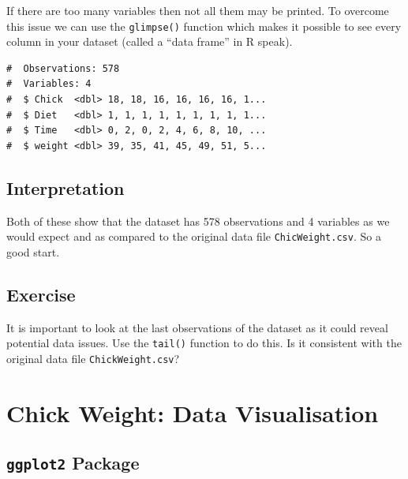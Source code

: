 \documentclass[a4paper,9pt,twocolumn,twoside,printwatermark=false]{pinp}
\begin{document}
If there are too many variables then not all them may be printed. To
overcome this issue we can use the \texttt{glimpse()} function which
makes it possible to see every column in your dataset (called a ``data
frame'' in R speak).

\begin{Shaded}
\begin{Highlighting}[]
\end{Highlighting}
\end{Shaded}

\begin{ShadedResult}
\begin{verbatim}
#  Observations: 578
#  Variables: 4
#  $ Chick  <dbl> 18, 18, 16, 16, 16, 16, 1...
#  $ Diet   <dbl> 1, 1, 1, 1, 1, 1, 1, 1, 1...
#  $ Time   <dbl> 0, 2, 0, 2, 4, 6, 8, 10, ...
#  $ weight <dbl> 39, 35, 41, 45, 49, 51, 5...
\end{verbatim}
\end{ShadedResult}

\subsection{Interpretation}\label{interpretation}

Both of these show that the dataset has 578 observations and 4 variables
as we would expect and as compared to the original data file
\texttt{ChicWeight.csv}. So a good start.

\subsection{Exercise}\label{exercise-2}

It is important to look at the last observations of the dataset as it
could reveal potential data issues. Use the \texttt{tail()} function to
do this. Is it consistent with the original data file
\texttt{ChickWeight.csv}?

\section{Chick Weight: Data
Visualisation}\label{chick-weight-data-visualisation}

\subsection{\texorpdfstring{\texttt{ggplot2}
Package}{ggplot2 Package}}\label{ggplot2-package}
\end{document}
